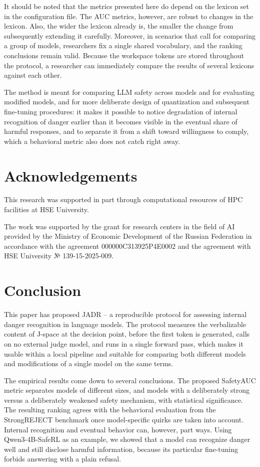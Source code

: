 \documentclass[10pt,twocolumn]{article}
\begin{document}
It should be noted that the metrics presented here do depend on the lexicon set in the configuration file. The AUC metrics, however, are robust to changes in the lexicon. Also, the wider the lexicon already is, the smaller the change from subsequently extending it carefully. Moreover, in scenarios that call for comparing a group of models, researchers fix a single shared vocabulary, and the ranking conclusions remain valid. Because the workspace tokens are stored throughout the protocol, a researcher can immediately compare the results of several lexicons against each other.

The method is meant for comparing LLM safety across models and for evaluating modified models, and for more deliberate design of
quantization and subsequent fine-tuning procedures: it makes it possible to notice degradation of internal
recognition of danger earlier than it becomes visible in the eventual share of harmful responses, and
to separate it from a shift toward willingness to comply, which a behavioral
metric also does not catch right away.

\section{Acknowledgements}

This research was supported in part through computational resources of HPC facilities at HSE University.

The work was supported by the grant for research centers in the field of AI provided by the Ministry of Economic Development of the Russian Federation in accordance with the agreement 000000C313925P4E0002 and the agreement with HSE University № 139-15-2025-009.

\section{Conclusion}
\label{sec:conclusion}

This paper has proposed JADR -- a reproducible protocol for assessing internal danger recognition in language models. The protocol measures the verbalizable content of J-space at the decision point, before the first token is generated, calls on no external judge model, and runs in a single forward pass, which makes it usable within a local pipeline and suitable for comparing both different models and modifications of a single model on the same terms.

The empirical results come down to several conclusions. The proposed SafetyAUC metric separates models of different sizes, and models with a deliberately strong versus a deliberately weakened safety mechanism, with statistical significance. The resulting ranking agrees with the behavioral evaluation from the StrongREJECT benchmark once model-specific quirks are taken into account. Internal recognition and eventual behavior can, however, part ways. Using Qwen3-4B-SafeRL as an example, we showed that a model can recognize danger well and still disclose harmful information, because its particular fine-tuning forbids answering with a plain refusal.
\end{document}
